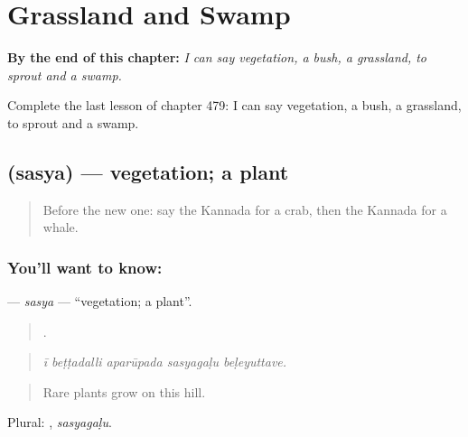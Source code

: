 
\chapter{Grassland and Swamp}
\label{ch:ka-grassland-and-swamp}

\begin{chapteropening}
\textbf{By the end of this chapter:} \emph{I can say vegetation, a bush, a grassland, to sprout and a swamp.}

Complete the last lesson of chapter 479: I can say vegetation, a bush, a grassland, to sprout and a swamp.
\end{chapteropening}

\section[\texorpdfstring{\kn{ಸಸ್ಯ} (sasya)}{ಸಸ್ಯ (sasya)}]{ (sasya) — vegetation; a plant}

\label{lesson:KA-C479-sasya}



\begin{quote}
Before the new one: say the Kannada for a crab, then the Kannada for a whale.
\end{quote}

\subsection*{You'll want to know: }
\textbf{} — \emph{sasya} — \textquotedblleft{}vegetation; a plant\textquotedblright{}.

\begin{quote}
    .
\end{quote}

\begin{quote}
\emph{ī beṭṭadalli aparūpada sasyagaḷu beḷeyuttave.}
\end{quote}

\begin{quote}
Rare plants grow on this hill.
\end{quote}

Plural: , \emph{sasyagaḷu}.

